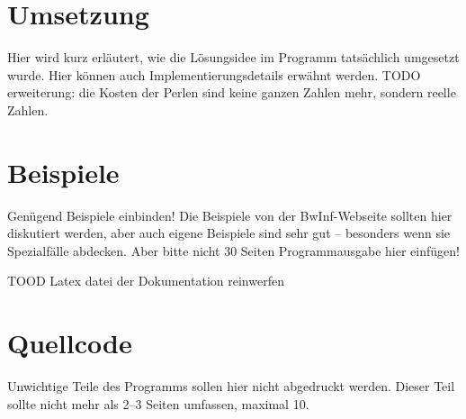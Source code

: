 \documentclass[a4paper,10pt,ngerman]{scrartcl}
\begin{document}
    \section{Umsetzung}

    Hier wird kurz erläutert, wie die Lösungsidee im Programm tatsächlich umgesetzt wurde. Hier können auch Implementierungsdetails erwähnt werden.
    TODO erweiterung: die Kosten der Perlen sind keine ganzen Zahlen mehr, sondern reelle Zahlen.


    \section{Beispiele}

    Genügend Beispiele einbinden! Die Beispiele von der BwInf-Webseite sollten hier diskutiert werden, aber auch eigene Beispiele sind sehr gut – besonders wenn sie Spezialfälle abdecken. Aber bitte nicht 30 Seiten Programmausgabe hier einfügen!

    TOOD Latex datei der Dokumentation reinwerfen


    \section{Quellcode}
    Unwichtige Teile des Programms sollen hier nicht abgedruckt werden. Dieser Teil sollte nicht mehr als 2–3 Seiten umfassen, maximal 10.
\end{document}
